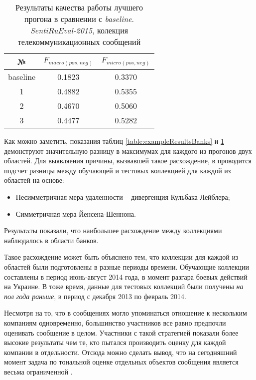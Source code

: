     \begin{table}[H]
        \centering
        \caption{Результаты качества работы лучшего прогона в сравнении с {\it baseline}.
        {\it SentiRuEval-2015}, колекция телекоммуникационных сообщений}
        \label{table:exampleResultsTTK}
        \begin{tabular}{|c|c|c|}
        \hline
        №                       &       $F_{macro(pos, neg)}$        & $F_{micro(pos, neg)}$  \\ \hline
        baseline                &           0.1823                      &       0.3370              \\ \hline \hline
        1                       &           0.4882                      &       0.5355              \\ \hline
        2                       &           0.4670                      &       0.5060              \\ \hline
        3                       &           0.4477                      &       0.5282              \\ \hline
        \end{tabular}
     \end{table}

    Как можно заметить, показания таблиц \ref{table:exampleResultsBanks} и \ref{table:exampleResultsTTK}
    демонструют значительную разницу в максимумах для каждого из прогонов двух областей.
    Для выявляения причины, вызвавшей такое расхождение, в \cite{tonalityanalisys}
    проводится подсчет разницы между обучающей и тестовых коллекцией для каждой из
    областей на основе:
    \begin{itemize}
        \item Несимметричная мера удаленности -- дивергенция Кульбака-Лейблера;
        \item Симметричная мера Йенсена-Шеннона.
    \end{itemize}

    Результaты показали, что наибольшее расхождение между коллекциями наблюдалось в
    области банков.

    Такое расхождение может быть объяснено тем, что коллекции для каждой из областей
    были подготовлены в разные периоды времени. Обучающие коллекции составлены в
    период июнь-август 2014 года, в момент разгара боевых действий на Украине.
    В тоже время, данные для тестовых коллекций были получены {\it на пол года раньше}, в период с
    декабря 2013 по февраль 2014.

    Несмотря на то, что в сообщениях могло упоминаться отношение к нескольким
    компаниям одновременно, большинство участников все равно предпочли
    оценивать сообщение в целом. Участники с такой стратегией показали
    более высокие результаты чем те, кто пытался производить оценку для каждой
    компании в отдельности. Отсюда можно сделать вывод, что на сегодняшний момент
    задача по тональной оценке отдельных объектов сообщения является весьма
    ограниченной \cite{tonalityanalisys}.
